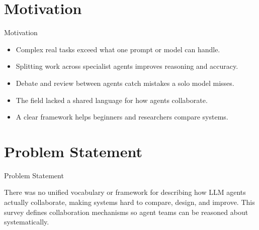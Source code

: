 \documentclass[10pt]{beamer}
\begin{document}
\section{Motivation}
\begin{frame}{Motivation}
\begin{itemize}
  \item Complex real tasks exceed what one prompt or model can handle.
  \item Splitting work across specialist agents improves reasoning and accuracy.
  \item Debate and review between agents catch mistakes a solo model misses.
  \item The field lacked a shared language for how agents collaborate.
  \item A clear framework helps beginners and researchers compare systems.
\end{itemize}
\end{frame}
\section{Problem Statement}
\begin{frame}{Problem Statement}
  \begin{block}{}
  There was no unified vocabulary or framework for describing how LLM agents actually collaborate, making systems hard to compare, design, and improve. This survey defines collaboration mechanisms so agent teams can be reasoned about systematically.
  \end{block}
\end{frame}
\end{document}

